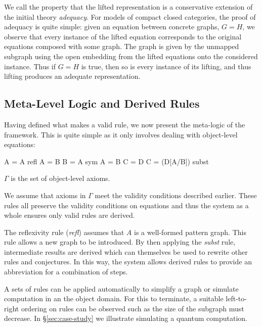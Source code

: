 \documentclass[runningheads]{llncs}
\begin{document}
We call the property that the lifted representation is a conservative
extension of the initial theory \emph{adequacy}. For models of compact
closed categories, the proof of adequacy is quite simple: given an
equation between concrete graphs, $G = H$, we observe that every
instance of the lifted equation corresponds to the original equations
composed with some graph. The graph is given by the unmapped subgraph
using the open embedding from the lifted equations onto the considered
instance. Thus if $G = H$ is true, then so is every instance of its
lifting, and thus lifting produces an adequate representation.

\subsection{Meta-Level Logic and Derived Rules}

Having defined what makes a valid rule, we now present the meta-logic
of the framework. This is quite simple as it only involves dealing
with object-level equations:

\begin{center}
\prooftree
\justifies
\Gamma \vdash A = A
\using\mbox{refl}
\endprooftree 
\quad\quad
\prooftree
\Gamma \vdash A = B
\justifies
\Gamma \vdash B = A
\using\mbox{sym}
\endprooftree
\quad\quad
\prooftree
\Gamma \vdash A = B \quad\quad
\Gamma \vdash C = D
\justifies
\Gamma \vdash C = (D[A/B])
\using\mbox{subst}
\endprooftree
\end{center}

\noindent $\Gamma$ is the set of object-level axioms. 

We assume that axioms in $\Gamma$ meet the validity conditions
described earlier. These rules all preserve the validity conditions on
equations and thus the system as a whole ensures only valid rules are
derived.

The reflexivity rule (\emph{refl}) assumes that $A$ is a well-formed
pattern graph. This rule allows a new graph to be introduced. By then
applying the \emph{subst} rule, intermediate results are derived which
can themselves be used to rewrite other rules and conjectures.  In
this way, the system allows derived rules to provide an abbreviation
for a combination of steps.

A sets of rules can be applied automatically to simplify a graph or
simulate computation in an the object domain. For this to terminate, a
suitable left-to-right ordering on rules can be observed such as the
size of the subgraph must decrease. In \S\ref{sec:case-study} we
illustrate simulating a quantum computation.
\end{document}
